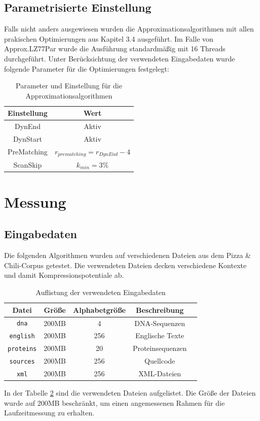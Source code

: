 \subsection{Parametrisierte Einstellung}
Falls nicht anders ausgewiesen wurden die Approximationsalgorithmen mit allen prakischen Optimierungen aus Kapitel 3.4 ausgeführt. Im Falle von Approx.LZ77Par
wurde die Ausführung standardmäßig mit 16 Threads durchgeführt. Unter Berücksichtung der verwendeten Eingabedaten wurde folgende Parameter für die 
Optimierungen festgelegt:
\begin{table} [ht]
    \centering
    \caption{Parameter und Einstellung für die Approximationsalgorithmen}
    \label{settings}
    \begin{tabular}{|c|c|}
        \hline
        \textbf{Einstellung} & \textbf{Wert} \\
        \hline
        DynEnd & Aktiv \\
        \hline
        DynStart & Aktiv \\
        \hline
        PreMatching & $r_{prematching}=r_{DynEnd}-4$ \\
        \hline
        ScanSkip & $k_{min}=3\%$ \\
        \hline
    \end{tabular}
\end{table}

\section{Messung}

\subsection{Eingabedaten}
Die folgenden Algorithmen wurden auf verschiedenen Dateien aus dem Pizza \& Chili-Corpus getestet. Die verwendeten Dateien decken verschiedene Kontexte und damit
Kompressionspotentiale ab.
\begin{table}[ht]
    \centering
    \caption{Auflistung der verwendeten Eingabedaten}
    \label{inputdata}
    \begin{tabular}{|c|c|c|c|c|}
        \hline
        \textbf{Datei} & \textbf{Größe} & \textbf{Alphabetgröße} & \textbf{Beschreibung} \\
        \hline
        \texttt{dna} & 200MB & 4 & DNA-Sequenzen \\
        \hline
        \texttt{english} & 200MB & 256 & Englische Texte \\
        \hline
        \texttt{proteins} & 200MB & 20 & Proteinsequenzen \\
        \hline
        \texttt{sources} & 200MB & 256 & Quellcode \\
        \hline
        \texttt{xml} & 200MB & 256 & XML-Dateien \\
        \hline
    \end{tabular}
\end{table}
In der Tabelle \ref{inputdata} sind die verwendeten Dateien aufgelistet. Die Größe der Dateien wurde auf 200MB beschränkt, um einen angemessenen Rahmen für die 
Laufzeitmessung zu erhalten.

